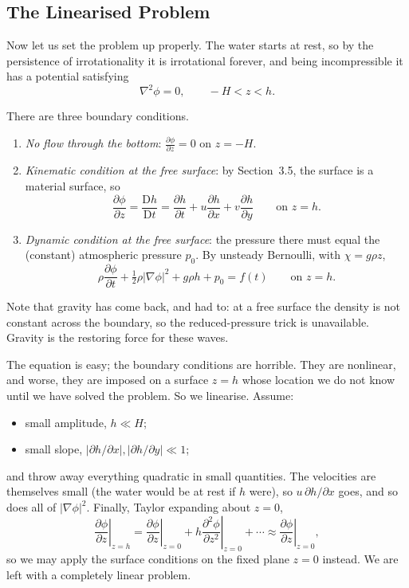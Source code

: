 \documentclass[a4paper]{scrartcl}
\newcommand{\D}{\mathrm{D}}
\newcommand{\Dt}[1]{\frac{\D #1}{\D t}}
\newcommand{\pd}[2]{\frac{\partial #1}{\partial #2}}
\newcommand{\pdd}[2]{\frac{\partial^2 #1}{\partial #2^2}}
\begin{document}
\subsection{The Linearised Problem}

Now let us set the problem up properly. The water starts at rest, so by the persistence of irrotationality it is irrotational forever, and being incompressible it has a potential satisfying
$$
\nabla^2 \phi = 0, \qquad -H < z < h.
$$

There are three boundary conditions.

\begin{enumerate}[label=(\roman*)]
	\item \emph{No flow through the bottom}: $\displaystyle \pd{\phi}{z} = 0$ on $z = -H$.
	\item \emph{Kinematic condition at the free surface}: by Section~3.5, the surface is a material surface, so
	$$
	\pd{\phi}{z} = \Dt{h} = \pd{h}{t} + u\pd{h}{x} + v\pd{h}{y} \qquad \text{on } z = h.
	$$
	\item \emph{Dynamic condition at the free surface}: the pressure there must equal the (constant) atmospheric pressure $p_0$. By unsteady Bernoulli, with $\chi = g\rho z$,
	$$
	\rho\pd{\phi}{t} + \tfrac{1}{2}\rho|\nabla\phi|^2 + g\rho h + p_0 = f(t) \qquad \text{on } z = h.
	$$
\end{enumerate}

Note that gravity has come back, and had to: at a free surface the density is not constant across the boundary, so the reduced-pressure trick is unavailable. Gravity is the restoring force for these waves.

The equation is easy; the boundary conditions are horrible. They are nonlinear, and worse, they are imposed on a surface $z = h$ whose location we do not know until we have solved the problem. So we linearise. Assume:
\begin{itemize}
	\item small amplitude, $h \ll H$;
	\item small slope, $|\partial h/\partial x|, |\partial h/\partial y| \ll 1$;
\end{itemize}
and throw away everything quadratic in small quantities. The velocities are themselves small (the water would be at rest if $h$ were), so $u \,\partial h/\partial x$ goes, and so does all of $|\nabla\phi|^2$. Finally, Taylor expanding about $z = 0$,
$$
\left.\pd{\phi}{z}\right|_{z=h} = \left.\pd{\phi}{z}\right|_{z=0} + h\left.\pdd{\phi}{z}\right|_{z=0} + \cdots \approx \left.\pd{\phi}{z}\right|_{z=0},
$$
so we may apply the surface conditions on the fixed plane $z = 0$ instead. We are left with a completely linear problem.
\end{document}
